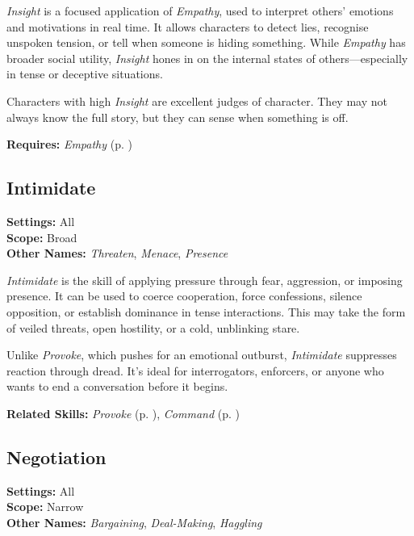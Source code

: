 \emph{Insight} is a focused application of \emph{Empathy}, used to interpret others' emotions and motivations in real time. It allows characters to detect lies, recognise unspoken tension, or tell when someone is hiding something. While \emph{Empathy} has broader social utility, \emph{Insight} hones in on the internal states of others—especially in tense or deceptive situations.

Characters with high \emph{Insight} are excellent judges of character. They may not always know the full story, but they can sense when something is off.

\vspace{0.5\baselineskip}
\noindent\textbf{Requires:} \emph{Empathy} (p. \pageref{skill:empathy})



\subsection{Intimidate}\label{skill:intimidate}
\textbf{Settings:} All\\
\textbf{Scope:} Broad\\
\textbf{Other Names:} \emph{Threaten}, \emph{Menace}, \emph{Presence}\\
\vspace{\baselineskip}

\emph{Intimidate} is the skill of applying pressure through fear, aggression, or imposing presence. It can be used to coerce cooperation, force confessions, silence opposition, or establish dominance in tense interactions. This may take the form of veiled threats, open hostility, or a cold, unblinking stare.

Unlike \emph{Provoke}, which pushes for an emotional outburst, \emph{Intimidate} suppresses reaction through dread. It’s ideal for interrogators, enforcers, or anyone who wants to end a conversation before it begins.

\vspace{0.5\baselineskip}
\noindent\textbf{Related Skills:} \emph{Provoke} (p. \pageref{skill:provoke}), \emph{Command} (p. \pageref{skill:command})



\subsection{Negotiation}\label{skill:negotiation}
\textbf{Settings:} All\\
\textbf{Scope:} Narrow\\
\textbf{Other Names:} \emph{Bargaining}, \emph{Deal-Making}, \emph{Haggling}\\
\vspace{\baselineskip}


